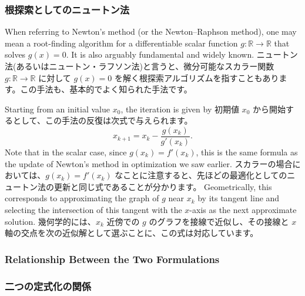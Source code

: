 \documentclass[0_main]{subfiles}
\begin{document}
    \subsubsection{根探索としてのニュートン法}
\fi

\ifEn
    When referring to Newton's method (or the Newton--Raphson method), one may mean a root-finding algorithm for a differentiable scalar function $g\colon \mathbb{R} \to \mathbb{R}$ that solves $g(x) = 0$. It is also arguably fundamental and widely known.
\else
    ニュートン法(あるいはニュートン・ラフソン法)と言うと、微分可能なスカラー関数 $g\colon \mathbb{R} \to \mathbb{R}$ に対して $g(x) = 0$ を解く根探索アルゴリズムを指すこともあります。この手法も、基本的でよく知られた手法です。
\fi

\ifEn
    Starting from an initial value $x_0$, the iteration is given by
\else
    初期値 $x_0$ から開始するとして、この手法の反復は次式で与えられます。
\fi
\begin{equation*}
    x_{k+1} = x_k - \frac{g(x_k)}{g'(x_k)}.
\end{equation*}
\ifEn
    Note that in the scalar case, since $g(x_k)=f'(x_k)$, this is the same formula as the update of Newton's method in optimization we saw earlier.
\else
    スカラーの場合においては、$g(x_k)=f'(x_k)$ なことに注意すると、先ほどの最適化としてのニュートン法の更新と同じ式であることが分かります。
\fi
\ifEn
    Geometrically, this corresponds to approximating the graph of $g$ near $x_k$ by its tangent line and selecting the intersection of this tangent with the $x$-axis as the next approximate solution.
\else
    幾何学的には、$x_k$ 近傍での $g$ のグラフを接線で近似し、その接線と $x$ 軸の交点を次の近似解として選ぶことに、この式は対応しています。
\fi

\ifEn
    \subsubsection{Relationship Between the Two Formulations}
\else
    \subsubsection{二つの定式化の関係}
\fi
\end{document}
